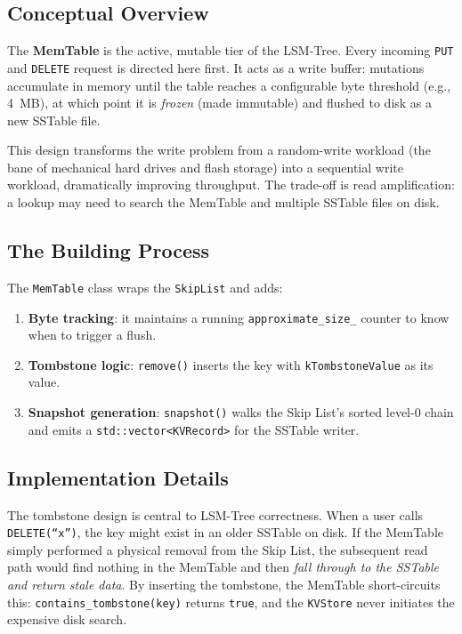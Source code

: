 \documentclass[11pt,a4paper]{article}
\begin{document}
\subsection{Conceptual Overview}

The \textbf{MemTable} is the active, mutable tier of the LSM-Tree. Every
incoming \texttt{PUT} and \texttt{DELETE} request is directed here first. It
acts as a write buffer: mutations accumulate in memory until the table reaches
a configurable byte threshold (e.g., 4~MB), at which point it is
\emph{frozen} (made immutable) and flushed to disk as a new SSTable file.

This design transforms the write problem from a random-write workload (the
bane of mechanical hard drives and flash storage) into a sequential write
workload, dramatically improving throughput. The trade-off is read amplification:
a lookup may need to search the MemTable and multiple SSTable files on disk.

\subsection{The Building Process}

The \texttt{MemTable} class wraps the \texttt{SkipList} and adds:
\begin{enumerate}[noitemsep]
    \item \textbf{Byte tracking}: it maintains a running \texttt{approximate\_size\_} counter to know when to trigger a flush.
    \item \textbf{Tombstone logic}: \texttt{remove()} inserts the key with \texttt{kTombstoneValue} as its value.
    \item \textbf{Snapshot generation}: \texttt{snapshot()} walks the Skip List's sorted level-0 chain and emits a \texttt{std::vector<KVRecord>} for the SSTable writer.
\end{enumerate}

\subsection{Implementation Details}

The tombstone design is central to LSM-Tree correctness. When a user calls
\texttt{DELETE(``x'')}, the key might exist in an older SSTable on disk.
If the MemTable simply performed a physical removal from the Skip List, the
subsequent read path would find nothing in the MemTable and then \emph{fall
through to the SSTable and return stale data}. By inserting the tombstone,
the MemTable short-circuits this: \texttt{contains\_tombstone(key)} returns
\texttt{true}, and the \texttt{KVStore} never initiates the expensive disk search.
\end{document}
